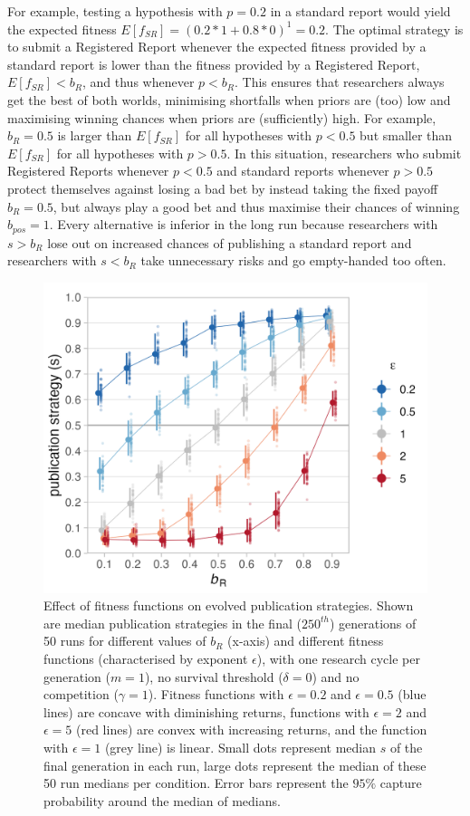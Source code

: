 \documentclass[
  ,man,mask,floatsintext]{apa6}
\begin{document}
For example, testing a hypothesis with \(p = 0.2\) in a standard report would yield the expected fitness \(E[f_{SR}] = (0.2 * 1 + 0.8 * 0)^1 = 0.2\).
The optimal strategy is to submit a Registered Report whenever the expected fitness provided by a standard report is lower than the fitness provided by a Registered Report, \(E[f_{SR}] < b_{R}\), and thus whenever \(p < b_{R}\).
This ensures that researchers always get the best of both worlds, minimising shortfalls when priors are (too) low and maximising winning chances when priors are (sufficiently) high.
For example, \(b_{R} = 0.5\) is larger than \(E[f_{SR}]\) for all hypotheses with \(p < 0.5\) but smaller than \(E[f_{SR}]\) for all hypotheses with \(p > 0.5\).
In this situation, researchers who submit Registered Reports whenever \(p<0.5\) and standard reports whenever \(p>0.5\) protect themselves against losing a bad bet by instead taking the fixed payoff \(b_{R} = 0.5\), but always play a good bet and thus maximise their chances of winning \(b_{pos} = 1\).
Every alternative is inferior in the long run because researchers with \(s > b_{R}\) lose out on increased chances of publishing a standard report and researchers with \(s < b_{R}\) take unnecessary risks and go empty-handed too often.



\begin{figure}

{\centering \includegraphics[width=0.65\linewidth]{plots/plot_epsilon_line_evo} 

}

\caption{Effect of fitness functions on evolved publication strategies. Shown are median publication strategies in the final (\(250^{th}\)) generations of 50 runs for different values of \(b_{R}\) (x-axis) and different fitness functions (characterised by exponent \(\epsilon\)), with one research cycle per generation (\(m = 1\)), no survival threshold (\(\delta = 0\)) and no competition (\(\gamma = 1\)). Fitness functions with \(\epsilon = 0.2\) and \(\epsilon = 0.5\) (blue lines) are concave with diminishing returns, functions with \(\epsilon = 2\) and \(\epsilon = 5\) (red lines) are convex with increasing returns, and the function with \(\epsilon = 1\) (grey line) is linear. Small dots represent median \(s\) of the final generation in each run, large dots represent the median of these 50 run medians per condition. Error bars represent the \(95\%\) capture probability around the median of medians.}\label{fig:epsilonplot}
\end{figure}
\end{document}
